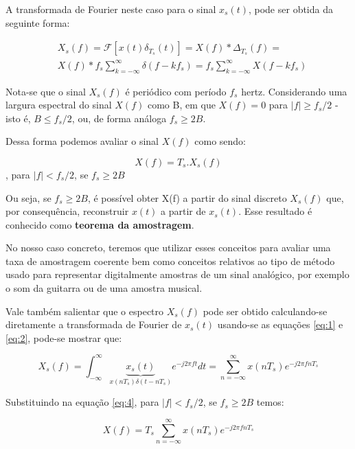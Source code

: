 		A transformada de Fourier neste caso para o sinal $x_s(t)$, pode ser obtida da seguinte forma:
		
		\begin{equation}
			\begin{aligned}
				&X_s(f) = \mathscr{F}[x(t)\delta_{T_s}(t)] = X(f)\ast\Delta_{T_s}(f)= 
				\\
				&X(f)\ast f_s\sum_{k=-\infty}^{\infty}\delta(f-kf_s) = \boxed{f_s\sum_{k=-\infty}^{\infty}X(f-kf_s)}
				\label{eq:3}
			\end{aligned}
		\end{equation}
		
		Nota-se que o sinal $X_s(f)$ é periódico com período $f_s$ hertz. Considerando uma largura espectral do sinal $X(f)$ como B, em que $X(f) = 0$ para $|f|\ge f_s/2$ - isto é, $B \le f_s/2$, ou, de forma análoga $f_s \ge 2B$.
		
		Dessa forma podemos avaliar o sinal $X(f)$ como sendo:
		
		\begin{equation}
			X(f) = T_s.X_s(f)
			\label{eq:4}
		\end{equation}, para $|f|<f_s/2$, se $f_s \ge 2B$
		
		Ou seja, se $f_s\ge 2B$, é possível obter X(f) a partir do sinal discreto $X_s(f)$ que, por consequência, reconstruir $x(t)$ a partir de $x_s(t)$. Esse resultado é conhecido como \textbf{teorema da amostragem}.
		
		No nosso caso concreto, teremos que utilizar esses conceitos para avaliar uma taxa de amostragem coerente bem como conceitos relativos ao tipo de método usado para representar digitalmente amostras de um sinal analógico, por exemplo o som da guitarra ou de uma amostra musical.
		
		Vale também salientar que o espectro $X_s(f)$ pode ser obtido calculando-se diretamente a transformada de Fourier de $x_s(t)$ usando-se as equações \eqref{eq:1} e \eqref{eq:2}, pode-se mostrar que:
		
		\begin{equation}
			X_s(f) = \int_{-\infty}^{\infty}\underbrace{x_s(t)}_{x(nT_s)\delta(t-nT_s)}e^{-j2\pi ft}dt = \sum_{n=-\infty}^{\infty}x(nT_s)e^{-j2\pi fnT_s}
			\label{eq:5}
		\end{equation}
		
		Substituindo na equação \eqref{eq:4}, para $|f|<f_s/2$, se $f_s\ge 2B$ temos:
		
		\begin{equation}
			X(f) = T_s\sum_{n=-\infty}^{\infty}x(nT_s)e^{-j2\pi fnT_s}
			\label{eq:6}
		\end{equation}
		
